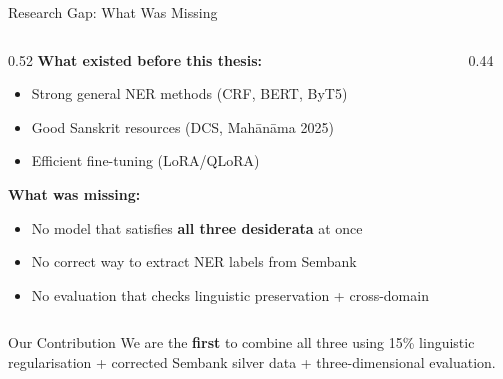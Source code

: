 \begin{frame}{Research Gap: What Was Missing}
  \begin{columns}[T]
    \begin{column}{0.52\textwidth}
      \textbf{What existed before this thesis:}
      \begin{itemize}
        \item Strong general NER methods (CRF, BERT, ByT5)
        \item Good Sanskrit resources (DCS, Mahānāma 2025)
        \item Efficient fine-tuning (LoRA/QLoRA)
      \end{itemize}
      \vspace{0.3cm}
      \textbf{What was missing:}
      \begin{itemize}
        \item No model that satisfies \textbf{all three desiderata} at once
        \item No correct way to extract NER labels from Sembank
        \item No evaluation that checks linguistic preservation + cross-domain
      \end{itemize}
    \end{column}
    \begin{column}{0.44\textwidth}
      \centering
    \end{column}
  \end{columns}

  \vspace{0.2cm}
  \begin{alertblock}{Our Contribution}
    We are the \textbf{first} to combine all three using 15\% linguistic regularisation + corrected Sembank silver data + three-dimensional evaluation.
  \end{alertblock}
\end{frame}

